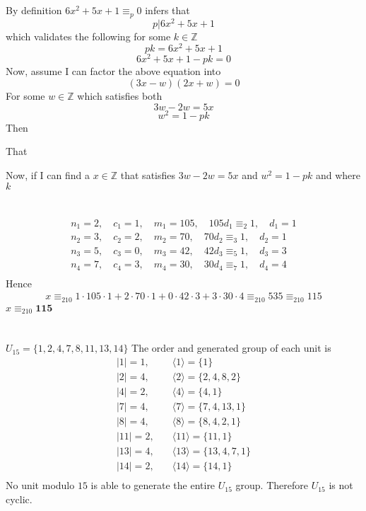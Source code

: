\documentclass{article}
\begin{document}
\section{}
By definition $6x^{2} + 5x + 1 \equiv_{p} 0$ infers that
\[ p|6x^{2} + 5x + 1 \]
which validates the following for some $k \in \mathbb{Z}$
\[ pk = 6x^{2} + 5x + 1 \]
\[ 6x^{2} + 5x + 1 - pk = 0 \]
Now, assume I can factor the above equation into
\[ (3x - w)(2x + w) = 0 \]
For some $w \in \mathbb{Z}$ which satisfies both
\[ 3w - 2w = 5x \]
\[ w^{2} = 1 - pk \]
Then 

That 

Now, if I can find a $x \in \mathbb{Z}$ that satisfies $3w - 2w = 5x$ and $w^{2} = 1 - pk$ and  where $k$

\section{}
\[
\begin{split}
n_{1} = 2, \quad
c_{1} = 1, \quad
m_{1} = 105, \quad
105d_{1} \equiv_{2} 1,\quad
d_{1} = 1 \\
n_{2} = 3, \quad
c_{2} = 2, \quad
m_{2} = 70, \quad
70d_{2} \equiv_{3} 1,\quad
d_{2} = 1 \\
n_{3} = 5, \quad
c_{3} = 0, \quad
m_{3} = 42, \quad
42d_{3} \equiv_{5} 1,\quad
d_{3} = 3 \\
n_{4} = 7, \quad
c_{4} = 3, \quad
m_{4} = 30, \quad
30d_{4} \equiv_{7} 1,\quad
d_{4} = 4 \\
\end{split}
\]
Hence
\[
\begin{split}
x \equiv_{210}
1 \cdot 105 \cdot 1 +
2 \cdot 70 \cdot 1 + 
0 \cdot 42 \cdot 3 +
3 \cdot 30 \cdot 4
\equiv_{210}
535
\equiv_{210}
115
\end{split}
\]
$x \equiv_{210} \textbf{115}$

\section{}
$U_{15} = \{1, 2, 4, 7, 8, 11, 13, 14\}$
The order and generated group of each unit is
\[
\begin{split}
|1| = 1, \quad &\langle 1 \rangle = \{1\} \\
|2| = 4, \quad &\langle 2 \rangle = \{2,4,8,2\} \\
|4| = 2, \quad &\langle 4 \rangle = \{4, 1\} \\
|7| = 4, \quad &\langle 7 \rangle = \{7, 4, 13, 1\} \\
|8| = 4, \quad &\langle 8 \rangle = \{8, 4, 2, 1\} \\
|11| = 2, \quad &\langle 11 \rangle = \{11, 1\}\\
|13| = 4, \quad &\langle 13 \rangle = \{13, 4, 7, 1\}\\
|14| = 2, \quad &\langle 14 \rangle = \{14, 1\} \\
\end{split}
\]
No unit modulo $15$ is able to generate the entire $U_{15}$ group.
Therefore $U_{15}$ is not cyclic.
\end{document}
